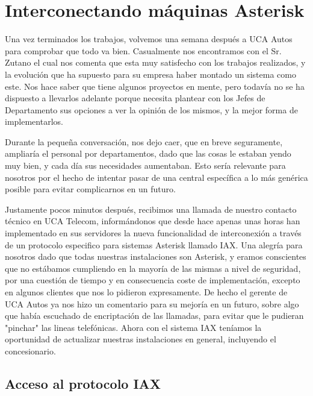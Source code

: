 \newpage

\color[rgb]{0,0,1}

\section{Interconectando máquinas Asterisk}

Una vez terminados los trabajos, volvemos una semana después a UCA Autos para comprobar que todo va bien. Casualmente nos encontramos con el Sr. Zutano el cual nos comenta que esta muy satisfecho con los trabajos realizados, y la evolución que ha supuesto para su empresa haber montado un sistema como este. Nos hace saber que tiene algunos proyectos en mente, pero todavía no se ha dispuesto a llevarlos adelante porque necesita plantear con los Jefes de Departamento sus opciones a ver la opinión de los mismos, y la mejor forma de implementarlos. 

Durante la pequeña conversación, nos dejo caer, que en breve seguramente, ampliaría el personal por departamentos, dado que las cosas le estaban yendo muy bien, y cada día sus necesidades aumentaban. Esto sería relevante para nosotros por el hecho de intentar pasar de una central específica a lo más genérica posible para evitar complicarnos en un futuro.

Justamente pocos minutos después, recibimos una llamada de nuestro contacto técnico en UCA Telecom, informándonos que desde hace apenas unas horas han implementado en sus servidores la nueva funcionalidad de interconexión a través de un protocolo especifico para sistemas Asterisk llamado IAX. Una alegría para nosotros dado que todas nuestras instalaciones son Asterisk, y eramos conscientes que no estábamos cumpliendo en la mayoría de las mismas a nivel de seguridad, por una cuestión de tiempo y en consecuencia coste de implementación, excepto en algunos clientes que nos lo pidieron expresamente. De hecho el gerente de UCA Autos ya nos hizo un comentario para su mejoría en un futuro, sobre algo que había escuchado de encriptación de las llamadas, para evitar que le pudieran "pinchar" las lineas telefónicas. Ahora con el sistema IAX teníamos la oportunidad de actualizar nuestras instalaciones en general, incluyendo el concesionario.

\newpage

\color[rgb]{0,0,0}

\subsection{Acceso al protocolo IAX}

